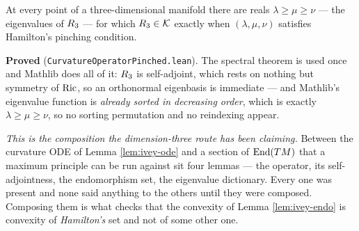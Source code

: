 \begin{lemma}
  \label{lem:curvature-operator-pinched}
  \leanok
  At every point of a three-dimensional manifold there are reals $\lambda \ge \mu \ge \nu$ ---
  the eigenvalues of $R_3$ --- for which $R_3 \in \mathcal{K}$ exactly when
  $(\lambda,\mu,\nu)$ satisfies Hamilton's pinching condition.

  \textbf{Proved} (\texttt{CurvatureOperatorPinched.lean}). The spectral theorem is used once
  and Mathlib does all of it: $R_3$ is self-adjoint, which rests on nothing but symmetry
  of $\operatorname{Ric}$, so an orthonormal eigenbasis is immediate --- and Mathlib's eigenvalue function
  is \emph{already sorted in decreasing order}, which is exactly $\lambda \ge \mu \ge \nu$, so
  no sorting permutation and no reindexing appear.

  \emph{This is the composition the dimension-three route has been claiming.} Between the
  curvature ODE of Lemma \ref{lem:ivey-ode} and a section of $\mathrm{End}(TM)$ that a
  maximum principle can be run against sit four lemmas --- the operator, its
  self-adjointness, the endomorphism set, the eigenvalue dictionary. Every one was present
  and none said anything to the others until they were composed. Composing them is what
  checks that the convexity of Lemma \ref{lem:ivey-endo} is convexity of \emph{Hamilton's}
  set and not of some other one.
\end{lemma}

